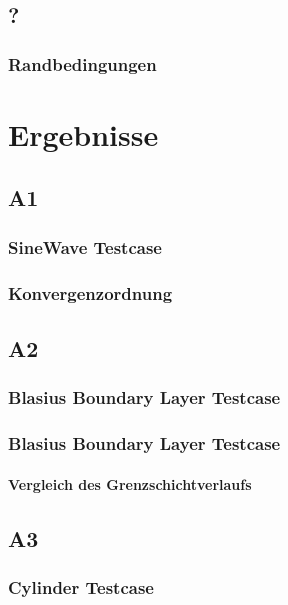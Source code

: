 \documentclass[
	11pt, %
	aspectratio=169, %
]{beamer}
\begin{document}
\subsection{?}
\begin{frame}
	\frametitle{Randbedingungen}

\end{frame}



\section{Ergebnisse}

\subsection{A1}
\begin{frame}
	\frametitle{SineWave Testcase}
	


\end{frame}


\begin{frame}
	\frametitle{Konvergenzordnung}


	\end{frame}




\subsection{A2}

\begin{frame}
	\frametitle{Blasius Boundary Layer Testcase}


\end{frame}


\begin{frame}
	\frametitle{Blasius Boundary Layer Testcase}
	\framesubtitle{Vergleich des Grenzschichtverlaufs} %
\end{frame}
	

\subsection{A3}
\begin{frame}
\frametitle{Cylinder Testcase}



\end{frame}
\end{document}
